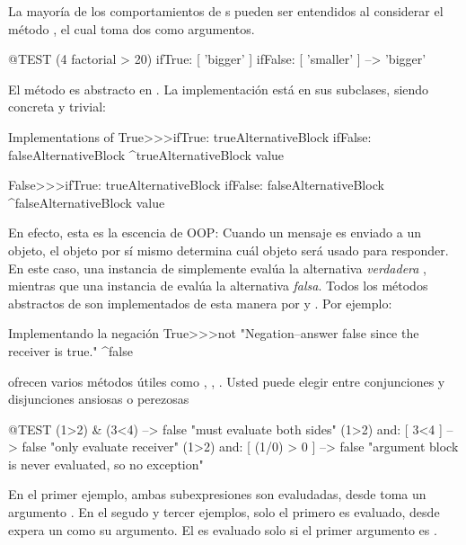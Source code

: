 \documentclass[a4paper,10pt,twoside]{book}
\begin{document}
La mayor\'ia de los comportamientos de s pueden ser entendidos al considerar el m\'etodo  , el cual toma dos  como argumentos.

\begin{code}{@TEST}
(4 factorial > 20) ifTrue: [ 'bigger' ] ifFalse: [ 'smaller' ] --> 'bigger'
\end{code}

El m\'etodo es abstracto en .
La implementaci\'on est\'a en sus subclases, siendo concreta y trivial:

\begin{method}{Implementations of }
True>>>ifTrue: trueAlternativeBlock ifFalse: falseAlternativeBlock 
    ^trueAlternativeBlock value

False>>>ifTrue: trueAlternativeBlock ifFalse: falseAlternativeBlock 
    ^falseAlternativeBlock value
\end{method}

En efecto, esta es la escencia de OOP: Cuando un mensaje es enviado a un objeto, el objeto por s\'i mismo determina cu\'al objeto ser\'a usado para responder. En este caso, una instancia de   simplemente eval\'ua la alternativa \emph{verdadera} , mientras que una instancia de   eval\'ua la alternativa \emph{falsa}. Todos los m\'etodos abstractos de  son implementados de esta manera por  y . Por ejemplo:

\begin{method}{Implementando la negaci\'on}
True>>>not
    "Negation--answer false since the receiver is true."
    ^false
\end{method}

 ofrecen varios m\'etodos \'utiles como , , . Usted puede elegir entre conjunciones y disjunciones ansiosas o perezosas

\begin{code}{@TEST}
(1>2) & (3<4)              --> false    "must evaluate both sides"
(1>2) and: [ 3<4 ]        --> false    "only evaluate receiver"
(1>2) and: [ (1/0) > 0 ] --> false    "argument block is never evaluated, so no exception"
\end{code}

En el primer ejemplo, ambas subexpresiones  son evaludadas, desde   toma un argumento .
En el segudo y tercer ejemplos, solo el primero es evaluado, desde  expera un  como su argumento.  El es evaluado solo si el primer argumento es .
\end{document}
